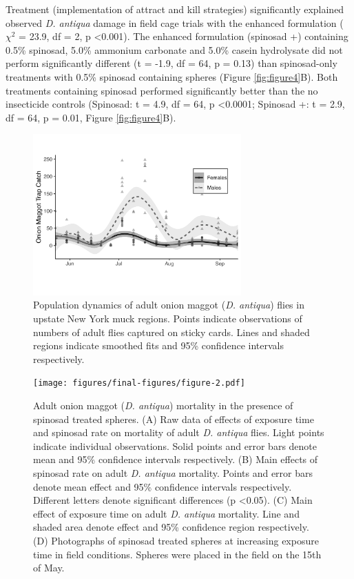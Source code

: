 \documentclass[alpha-refs]{wiley-article}
\begin{document}
Treatment (implementation of attract and kill strategies) significantly explained observed \textit{D. antiqua} damage in field cage trials with the enhanced formulation ($\chi^2$ = 23.9, df = 2, p \textless 0.001).  The enhanced formulation (spinosad +) containing 0.5\% spinosad, 5.0\% ammonium carbonate and 5.0\% casein hydrolysate did not perform significantly different (t = -1.9, df = 64, p = 0.13) than spinosad-only treatments with 0.5\% spinosad containing spheres (Figure \ref{fig:figure4}B).  Both treatments containing spinosad performed significantly better than the no insecticide controls (Spinosad: t = 4.9, df = 64, p \textless 0.0001; Spinosad +: t = 2.9, df = 64, p = 0.01, Figure \ref{fig:figure4}B).  


\begin{figure}[bt]
\centering
\includegraphics[width = 8cm]{figures/final-figures/figure-1.pdf}
\caption{Population dynamics of adult onion maggot (\textit{D. antiqua}) flies in upstate New York muck regions.  Points indicate observations of numbers of adult flies captured on sticky cards.  Lines and shaded regions indicate smoothed fits and 95\% confidence intervals respectively.  }
\label{fig:figure1}
\end{figure}

\begin{figure}[bt]
\centering
\texttt{[image: figures/final-figures/figure-2.pdf]}
\caption{Adult onion maggot (\textit{D. antiqua}) mortality in the presence of spinosad treated spheres.  (A) Raw data of effects of exposure time and spinosad rate on mortality of adult \textit{D. antiqua} flies.  Light points indicate individual observations.  Solid points and error bars denote mean and 95\% confidence intervals respectively.  (B) Main effects of spinosad rate on adult \textit{D. antiqua} mortality.  Points and error bars denote mean effect and 95\% confidence intervals respectively.  Different letters denote significant differences (p \textless 0.05).  (C) Main effect of exposure time on adult \textit{D. antiqua} mortality.  Line and shaded area denote effect and 95\% confidence region respectively.  (D) Photographs of spinosad treated spheres at increasing exposure time in field conditions.  Spheres were placed in the field on the 15th of May.  }
\label{fig:figure2}
\end{figure}
\end{document}
